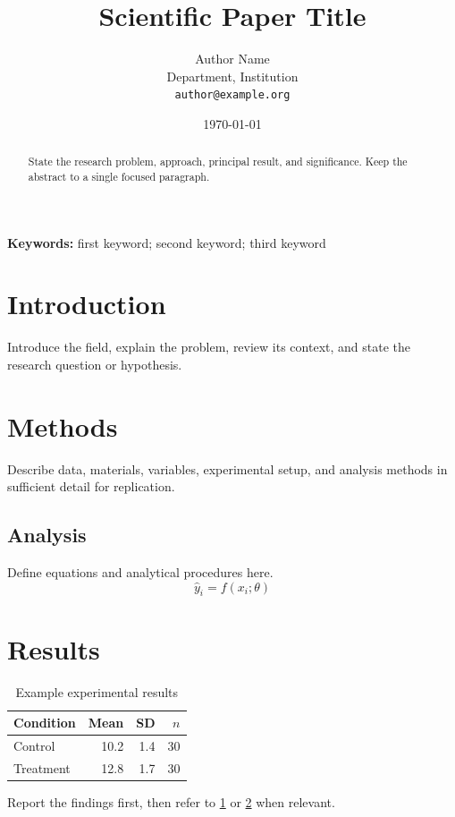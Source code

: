 \documentclass[11pt,a4paper]{article}
\title{Scientific Paper Title}
\author{Author Name\\
        Department, Institution\\
        \texttt{author@example.org}}
\date{\today}
\makeatletter
\renewcommand{\maketitle}{%
  \begin{center}
    {\displayfont\LARGE\bfseries\color{LrssnPrimaryText}\@title\par}
    \vspace{0.7em}
    {\large\@author\par}
    {\small\color{LrssnMuted}\@date\par}
  \end{center}
  \vspace{1em}
}
\makeatother
\begin{document}
\maketitle

\begin{abstract}
\noindent
State the research problem, approach, principal result, and significance.
Keep the abstract to a single focused paragraph.
\end{abstract}

\textbf{Keywords:} first keyword; second keyword; third keyword

\section{Introduction}
\label{sec:introduction}

Introduce the field, explain the problem, review its context, and state the
research question or hypothesis.

\section{Methods}
\label{sec:methods}

Describe data, materials, variables, experimental setup, and analysis methods
in sufficient detail for replication.

\subsection{Analysis}
Define equations and analytical procedures here.
\[
    \hat{y}_i = f(x_i;\theta)
\]

\section{Results}
\label{sec:results}

\begin{table}[htbp]
\centering
\caption{Example experimental results}
\begin{tabular}{lrrr}
\toprule
\textbf{Condition} & \textbf{Mean} & \textbf{SD} & \textbf{$n$} \\
\midrule
Control & 10.2 & 1.4 & 30 \\
Treatment & 12.8 & 1.7 & 30 \\
\bottomrule
\end{tabular}
\label{tab:results}
\end{table}

Report the findings first, then refer to \cref{tab:results} or
\cref{sec:methods} when relevant.
\end{document}
